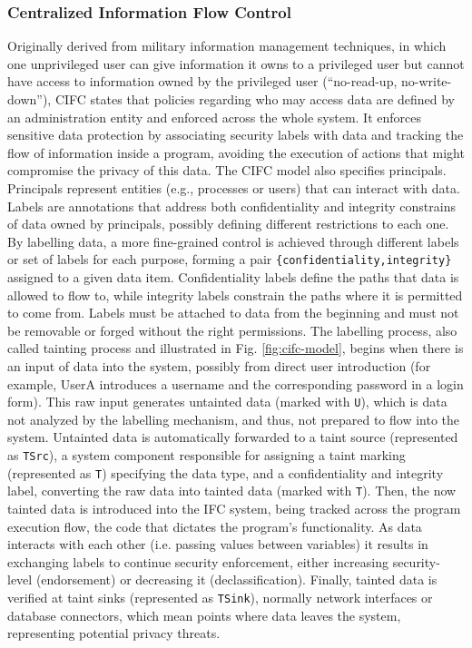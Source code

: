 \subsubsection{Centralized Information Flow Control}
\label{sec:cifc-model}

Originally derived from military information management techniques, in which one unprivileged user can give information it owns to a privileged user but cannot have access to information owned by the privileged user (``no-read-up, no-write-down''), CIFC states that policies regarding who may access data are defined by an administration entity and enforced across the whole system. It enforces sensitive data protection by associating security labels with data and tracking the flow of information inside a program, avoiding the execution of actions that might compromise the privacy of this data.
The CIFC model also specifies principals. Principals represent entities (e.g., processes or users) that can interact with data. Labels are annotations that address both confidentiality and integrity constrains of data owned by principals, possibly defining different restrictions to each one. By labelling data, a more fine-grained control is achieved through different labels or set of labels for each purpose, forming a pair \texttt{\{confidentiality,integrity\}} assigned to a given data item. Confidentiality labels define the paths that data is allowed to flow to, while integrity labels constrain the paths where it is permitted to come from. Labels must be attached to data from the beginning and must not be removable or forged without the right permissions.
The labelling process, also called tainting process and illustrated in Fig. \ref{fig:cifc-model}, begins when there is an input of data into the system, possibly from direct user introduction (for example, UserA introduces a username and the corresponding password in a login form). This raw input generates untainted data (marked with \texttt{U}), which is data not analyzed by the labelling mechanism, and thus, not prepared to flow into the system. Untainted data is automatically forwarded to a taint source (represented as \texttt{TSrc}), a system component responsible for assigning a taint marking (represented as \texttt{T}) specifying the data type, and a confidentiality and integrity label, converting the raw data into tainted data (marked with \texttt{T}). Then, the now tainted data is introduced into the IFC system, being tracked across the program execution flow, the code that dictates the program's functionality. As data interacts with each other (i.e. passing values between variables) it results in exchanging labels to continue security enforcement, either increasing security-level (endorsement) or decreasing it (declassification). Finally, tainted data is verified at taint sinks (represented as \texttt{TSink}), normally network interfaces or database connectors, which mean points where data leaves the system, representing potential privacy threats.

